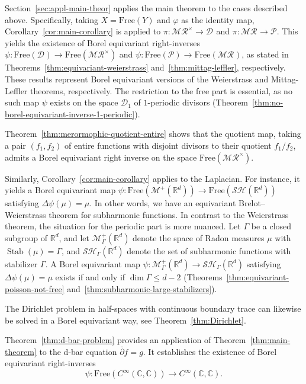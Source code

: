 \documentclass[12pt]{paper}
\numberwithin{equation}{section}
\theoremstyle{plain}
\theoremstyle{definition}
\newcommand{\C}{\mathbb{C}}
\newcommand{\Rd}{\mathbb{R}^{d}}
\newcommand{\smooth}[2][]{C^{\infty}_{#1}(#2)}
\newcommand{\smoothCC}{\smooth{\C,\C}}
\newcommand{\measp}[2][]{\mathcal{M}_{#1}^+(#2)}
\newcommand{\merom}[1][]{\mathcal{MR}_{#1}}
\newcommand{\meromnz}{\merom^{\times}}
\newcommand{\divis}[1][]{\mathcal{D}_{#1}}
\newcommand{\ppart}{\mathcal{P}}
\newcommand{\sharm}[2][]{\mathcal{SH}_{#1}(#2)}
\DeclareMathOperator{\stab}{\mathrm{Stab}}
\newcommand{\free}{\mathrm{Free}}
\renewcommand{\phi}{\varphi}
\begin{document}
Section~\ref{sec:appl-main-theor} applies the main theorem to the cases described above.
Specifically, taking \(X = \free(Y)\) and \(\phi\) as the identity map,
Corollary~\ref{cor:main-corollary} is applied to \(\pi : \meromnz \to \divis\) and
\(\pi : \merom \to \ppart\). This yields the existence of Borel equivariant right-inverses
\(\psi : \free(\divis) \to \free(\meromnz)\) and \(\psi : \free(\ppart) \to \free(\merom)\), as stated
in Theorems~\ref{thm:equivariant-weierstrass} and~\ref{thm:mittag-leffler}, respectively.  These
results represent Borel equivariant versions of the Weierstrass and Mittag-Leffler theorems,
respectively. The restriction to the free part is essential, as no such map \(\psi\) exists on the
space \(\divis[1]\) of \(1\)-periodic divisors
(Theorem~\ref{thm:no-borel-equivariant-inverse-1-periodic}).

Theorem~\ref{thm:merormophic-quotient-entire} shows that the quotient map, taking a pair \((f_1,f_2)\)
of entire functions with disjoint divisors to their quotient \(f_1/f_2\),
admits a Borel equivariant right inverse on the space \(\free(\meromnz)\).

Similarly, Corollary~\ref{cor:main-corollary} applies to the Laplacian. For instance, it yields a
Borel equivariant map \(\psi : \free(\measp{\Rd}) \to \free(\sharm{\Rd})\) satisfying
\(\Delta \psi(\mu) = \mu\). In other words, we have an equivariant Brelot--Weierstrass theorem for
subharmonic functions.  In contrast to the Weierstrass theorem, the situation for the periodic part
is more nuanced.  Let \(\Gamma\) be a closed subgroup of \(\Rd\), and let \(\measp[\Gamma]{\Rd}\)
denote the space of Radon measures \(\mu\) with \(\stab(\mu) = \Gamma\), and \(\sharm[\Gamma]{\Rd}\)
denote the set of subharmonic functions with stabilizer \(\Gamma\).  A Borel equivariant map
\(\psi : \measp[\Gamma]{\Rd} \to \sharm[\Gamma]{\Rd}\) satisfying \(\Delta \psi(\mu) = \mu\) exists
if and only if \(\dim \Gamma \le d-2\) (Theorems~\ref{thm:equivariant-poisson-not-free}
and~\ref{thm:subharmonic-large-stabilizers}).

The Dirichlet problem in half-spaces with continuous boundary trace can likewise be solved in
a Borel equivariant way, see Theorem~\ref{thm:Dirichlet}.

Theorem~\ref{thm:d-bar-problem} provides an application of Theorem~\ref{thm:main-theorem} to the
d-bar equation \(\bar{\partial} f = g\).  It establishes the existence of Borel equivariant
right-inverses \[\psi : \free(\smoothCC) \to \smoothCC.\]
\end{document}
